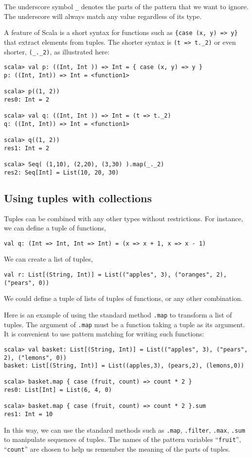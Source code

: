 \noindent The underscore symbol \lstinline!_! denotes the parts of
the pattern that we want to ignore. The underscore will always match
any value regardless of its type.

A feature of Scala is a short syntax for functions such as \lstinline!{case (x, y) => y}!
that extract elements from tuples. The shorter syntax is \lstinline!(t => t._2)!
or even shorter, \lstinline!(_._2)!, as illustrated here:
\begin{lstlisting}
scala> val p: ((Int, Int )) => Int = { case (x, y) => y }
p: ((Int, Int)) => Int = <function1>

scala> p((1, 2))
res0: Int = 2

scala> val q: ((Int, Int )) => Int = (t => t._2)
q: ((Int, Int)) => Int = <function1>

scala> q((1, 2))
res1: Int = 2

scala> Seq( (1,10), (2,20), (3,30) ).map(_._2)
res2: Seq[Int] = List(10, 20, 30)
\end{lstlisting}


\subsection{Using tuples with collections}

Tuples can be combined with any other types without restrictions.
For instance, we can define a tuple of functions,
\begin{lstlisting}
val q: (Int => Int, Int => Int) = (x => x + 1, x => x - 1)
\end{lstlisting}
We can create a list of tuples,
\begin{lstlisting}
val r: List[(String, Int)] = List(("apples", 3), ("oranges", 2), ("pears", 0))
\end{lstlisting}
We could define a tuple of lists of tuples of functions, or any other
combination.

Here is an example of using the standard method \lstinline!.map!
to transform a list of tuples. The argument of \lstinline!.map! must
be a function taking a tuple as its argument. It is convenient to
use pattern matching for writing such functions:
\begin{lstlisting}
scala> val basket: List[(String, Int)] = List(("apples", 3), ("pears", 2), ("lemons", 0))
basket: List[(String, Int)] = List((apples,3), (pears,2), (lemons,0))

scala> basket.map { case (fruit, count) => count * 2 }
res0: List[Int] = List(6, 4, 0)

scala> basket.map { case (fruit, count) => count * 2 }.sum
res1: Int = 10
\end{lstlisting}
In this way, we can use the standard methods such as \lstinline!.map!,
\lstinline!.filter!, \lstinline!.max!, \lstinline!.sum! to manipulate
sequences of tuples. The names of the pattern variables ``\lstinline!fruit!'',
``\lstinline!count!'' are chosen to help us remember the meaning
of the parts of tuples.

